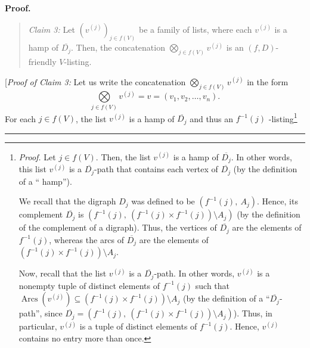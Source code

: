 \documentclass[numbers=enddot,12pt,final,onecolumn,notitlepage]{scrartcl}%
\numberwithin{exer}{section}
\theoremstyle{definition}
\newenvironment{statement}{\begin{quote}}{\end{quote}}
\newenvironment{proof}[1][Proof]{\noindent\textbf{#1.} }{\ \rule{0.5em}{0.5em}}
\newenvironment{verlong}{}{}
\begin{document}
\begin{verlong}
\begin{proof}
\begin{statement}
\textit{Claim 3:} Let $\left(  v^{\left(  j\right)  }\right)  _{j\in f\left(
V\right)  }$ be a family of lists, where each $v^{\left(  j\right)  }$ is a
hamp of $\overline{D_{j}}$. Then, the concatenation $\bigotimes\limits_{j\in
f\left(  V\right)  }v^{\left(  j\right)  }$ is an $\left(  f,D\right)
$-friendly $V$-listing.
\end{statement}

[\textit{Proof of Claim 3:} Let us write the concatenation $\bigotimes
\limits_{j\in f\left(  V\right)  }v^{\left(  j\right)  }$ in the form%
\[
\bigotimes\limits_{j\in f\left(  V\right)  }v^{\left(  j\right)  }=v=\left(
v_{1},v_{2},\ldots,v_{n}\right)  .
\]
For each $j\in f\left(  V\right)  $, the list $v^{\left(  j\right)  }$ is a
hamp of $\overline{D_{j}}$ and thus an $f^{-1}\left(  j\right)  $%
-listing\footnote{\textit{Proof.} Let $j\in f\left(  V\right)  $. Then, the
list $v^{\left(  j\right)  }$ is a hamp of $\overline{D_{j}}$. In other words,
this list $v^{\left(  j\right)  }$ is a $\overline{D_{j}}$-path that contains
each vertex of $\overline{D_{j}}$ (by the definition of a \textquotedblleft
hamp\textquotedblright).
\par
We recall that the digraph $D_{j}$ was defined to be $\left(  f^{-1}\left(
j\right)  ,\ A_{j}\right)  $. Hence, its complement $\overline{D_{j}}$ is
$\left(  f^{-1}\left(  j\right)  ,\ \left(  f^{-1}\left(  j\right)  \times
f^{-1}\left(  j\right)  \right)  \setminus A_{j}\right)  $ (by the definition
of the complement of a digraph). Thus, the vertices of $\overline{D_{j}}$ are
the elements of $f^{-1}\left(  j\right)  $, whereas the arcs of $\overline
{D_{j}}$ are the elements of $\left(  f^{-1}\left(  j\right)  \times
f^{-1}\left(  j\right)  \right)  \setminus A_{j}$.
\par
Now, recall that the list $v^{\left(  j\right)  }$ is a $\overline{D_{j}}%
$-path. In other words, $v^{\left(  j\right)  }$ is a nonempty tuple of
distinct elements of $f^{-1}\left(  j\right)  $ such that
$\operatorname*{Arcs}\left(  v^{\left(  j\right)  }\right)  \subseteq\left(
f^{-1}\left(  j\right)  \times f^{-1}\left(  j\right)  \right)  \setminus
A_{j}$ (by the definition of a \textquotedblleft$\overline{D_{j}}%
$-path\textquotedblright, since $\overline{D_{j}}=\left(  f^{-1}\left(
j\right)  ,\ \left(  f^{-1}\left(  j\right)  \times f^{-1}\left(  j\right)
\right)  \setminus A_{j}\right)  $). Thus, in particular, $v^{\left(
j\right)  }$ is a tuple of distinct elements of $f^{-1}\left(  j\right)  $.
Hence, $v^{\left(  j\right)  }$ contains no entry more than once.
}
\end{proof}
\end{verlong}
\end{document}
